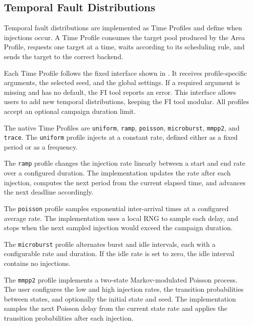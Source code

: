 \subsection{Temporal Fault Distributions}
\label{chap8:fi_time}

Temporal fault distributions are implemented as Time Profiles and define when injections occur. A Time Profile consumes the target pool produced by the Area Profile, requests one target at a time, waits according to its scheduling rule, and sends the target to the correct backend.

Each Time Profile follows the fixed interface shown in . It receives profile-specific arguments, the selected seed, and the global settings. If a required argument is missing and has no default, the \ac{FI} tool reports an error. This interface allows users to add new temporal distributions, keeping the \ac{FI} tool modular. All profiles accept an optional campaign duration limit.

The native Time Profiles are \texttt{uniform}, \texttt{ramp}, \texttt{poisson}, \texttt{microburst}, \texttt{mmpp2}, and \texttt{trace}. The \texttt{uniform} profile injects at a constant rate, defined either as a fixed period or as a frequency.

The \texttt{ramp} profile changes the injection rate linearly between a start and end rate over a configured duration. The implementation updates the rate after each injection, computes the next period from the current elapsed time, and advances the next deadline accordingly.

The \texttt{poisson} profile samples exponential inter-arrival times at a configured average rate. The implementation uses a local \ac{RNG} to sample each delay, and stops when the next sampled injection would exceed the campaign duration.

The \texttt{microburst} profile alternates burst and idle intervals, each with a configurable rate and duration. If the idle rate is set to zero, the idle interval contains no injections.

The \texttt{mmpp2} profile implements a two-state Markov-modulated Poisson process. The user configures the low and high injection rates, the transition probabilities between states, and optionally the initial state and seed. The implementation samples the next Poisson delay from the current state rate and applies the transition probabilities after each injection.

